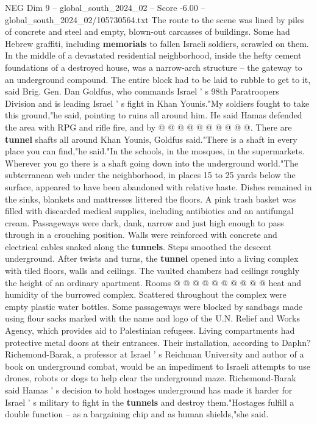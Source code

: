 \begin{textsample}{NEG Dim 9 – global\_south\_2024\_02 – Score -6.00 – global\_south\_2024\_02/105730564.txt}
The route to the scene was lined by piles of concrete and steel and empty, blown-out carcasses of buildings.
Some had Hebrew graffiti, including \textbf{memorials} to fallen Israeli soldiers, scrawled on them.
In the middle of a devastated residential neighborhood, inside the hefty cement foundations of a destroyed house, was a narrow-arch structure -- the gateway to an underground compound.
The entire block had to be laid to rubble to get to it, said Brig.
Gen.
Dan Goldfus, who commands Israel ' s 98th Paratroopers Division and is leading Israel ' s fight in Khan Younis."My soldiers fought to take this ground,"he said, pointing to ruins all around him.
He said Hamas defended the area with RPG and rifle fire, and by @ @ @ @ @ @ @ @ @ @.
There are \textbf{tunnel} shafts all around Khan Younis, Goldfus said."There is a shaft in every place you can find,"he said."In the schools, in the mosques, in the supermarkets.
Wherever you go there is a shaft going down into the underground world."The subterranean web under the neighborhood, in places 15 to 25 yards below the surface, appeared to have been abandoned with relative haste.
Dishes remained in the sinks, blankets and mattresses littered the floors.
A pink trash basket was filled with discarded medical supplies, including antibiotics and an antifungal cream.
Passageways were dark, dank, narrow and just high enough to pass through in a crouching position.
Walls were reinforced with concrete and electrical cables snaked along the \textbf{tunnels}.
Steps smoothed the descent underground.
After twists and turns, the \textbf{tunnel} opened into a living complex with tiled floors, walls and ceilings.
The vaulted chambers had ceilings roughly the height of an ordinary apartment.
Rooms @ @ @ @ @ @ @ @ @ @ heat and humidity of the burrowed complex.
Scattered throughout the complex were empty plastic water bottles.
Some passageways were blocked by sandbags made using flour sacks marked with the name and logo of the U.N.
Relief and Works Agency, which provides aid to Palestinian refugees.
Living compartments had protective metal doors at their entrances.
Their installation, according to Daphn?
Richemond-Barak, a professor at Israel ' s Reichman University and author of a book on underground combat, would be an impediment to Israeli attempts to use drones, robots or dogs to help clear the underground maze.
Richemond-Barak said Hamas ' s decision to hold hostages underground has made it harder for Israel ' s military to fight in the \textbf{tunnels} and destroy them."Hostages fulfill a double function -- as a bargaining chip and as human shields,"she said.

\end{textsample}
